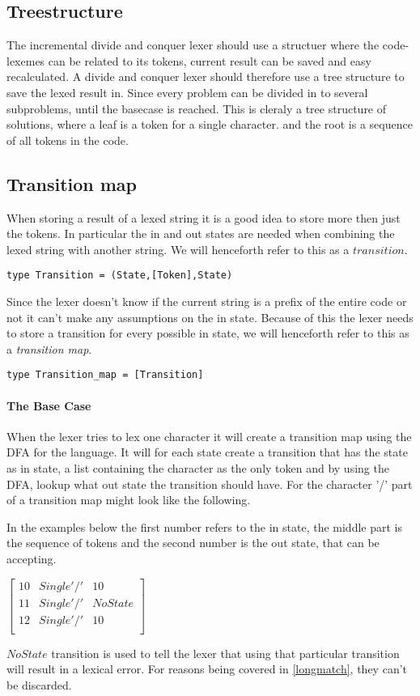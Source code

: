\subsection{Treestructure} %
The incremental divide and conquer lexer should use a structuer where the
code-lexemes can be related to its tokens, current result can be saved and easy
recalculated. A divide and conquer lexer should therefore use a tree structure
to save the lexed result in. Since every problem can be divided in to several
subproblems, until the basecase is reached. This is cleraly a tree structure of
solutions, where a leaf is a token for a single character. and the root
is a sequence of all tokens in the code.  



\subsection{Transition map} %
When storing a result of a lexed string it is a good idea to store more then
just the tokens. In particular the in and out states are needed when combining
the lexed string with another string. We will henceforth refer to this as a
$transition$.
\begin{verbatim}
type Transition = (State,[Token],State)
\end{verbatim}
Since the lexer doesn't know if the current string is a prefix of the entire
code or not it can't make any assumptions on the in state. Because of this the
lexer needs to store a transition for every possible in state, we will henceforth
refer to this as a \emph{transition map}.
\begin{verbatim}
type Transition_map = [Transition]
\end{verbatim}
\paragraph{The Base Case}
When the lexer tries to lex one character it will create a transition
map using the DFA for the language. It will for each state create a transition
that has the state as in state, a list containing the character as the only
token and by using the DFA, lookup what out state the transition should have.
For the character '/' part of a transition map might look like the following.

In the
examples below the first number refers to the in state, the middle part is the
sequence of tokens and the second number is the out state, that can be accepting.
\begin{center}
$\left[\begin{array}{ccc}
10&Single '/'&10\\
11&Single '/'&NoState\\
12&Single '/'&10\\
\end{array}\right]$
\end{center}
$NoState$ transition is used to tell the lexer that using that particular 
transition will result in a lexical error. For reasons being covered in
\cref{longmatch}, they can't be discarded.

